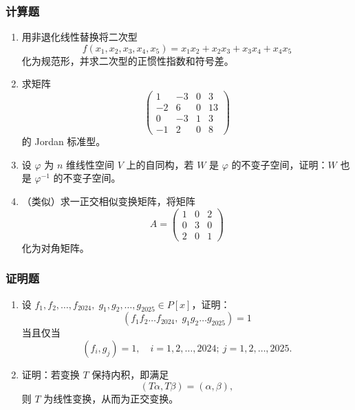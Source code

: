 \subsubsection*{计算题}

\begin{enumerate}
    \item 用非退化线性替换将二次型
    \begin{equation*}
    f(x_{1},x_{2},x_{3},x_{4},x_{5})=x_{1}x_{2}+x_{2}x_{3}+x_{3}x_{4}+x_{4}x_{5}
    \end{equation*}
    化为规范形，并求二次型的正惯性指数和符号差。

    \item 求矩阵
    \begin{equation*}
    \begin{pmatrix}
    1 & -3 & 0  & 3 \\
    -2 & 6 & 0 & 13 \\
    0 & -3 & 1 & 3 \\
    -1 & 2 & 0 & 8
    \end{pmatrix}
    \end{equation*}
    的 Jordan 标准型。

    \item 设 \(\varphi\) 为 \(n\) 维线性空间 \(V\) 上的自同构，若 \(W\) 是 \(\varphi\) 的不变子空间，证明：\(W\) 也是 \(\varphi^{-1}\) 的不变子空间。

    \item （类似）求一正交相似变换矩阵，将矩阵
    \begin{equation*}
    A=\begin{pmatrix}1 & 0 & 2 \\ 0 & 3 & 0 \\ 2 & 0 & 1\end{pmatrix}
    \end{equation*}
    化为对角矩阵。
\end{enumerate}

\subsubsection*{证明题}

\begin{enumerate}
    \item 设 \(f_{1},f_{2},\dots,f_{2024},\; g_{1},g_{2},\dots,g_{2025} \in P[x]\)，证明：
    \begin{equation*}
    (f_{1}f_{2}\dots f_{2024},\; g_{1}g_{2}\dots g_{2025})=1
    \end{equation*}
    当且仅当
    \begin{equation*}
    (f_{i},g_{j})=1,\quad i=1,2,\dots,2024;\ j=1,2,\dots,2025.
    \end{equation*}

    \item 证明：若变换 \(T\) 保持内积，即满足
    \begin{equation*}
    (T\alpha, T\beta)=(\alpha,\beta),
    \end{equation*}
    则 \(T\) 为线性变换，从而为正交变换。
\end{enumerate}